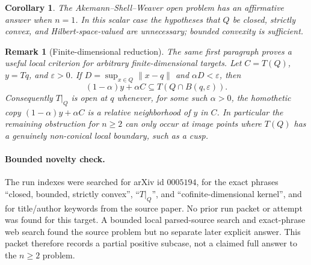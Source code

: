 \documentclass[11pt]{article}
\newtheorem{corollary}{Corollary}
\newtheorem{remark}{Remark}
\begin{document}
\begin{corollary}
The Akemann--Shell--Weaver open problem has an affirmative answer when
\(n=1\).  In this scalar case the hypotheses that \(Q\) be closed, strictly
convex, and Hilbert-space-valued are unnecessary; bounded convexity is
sufficient.
\end{corollary}

\begin{remark}[Finite-dimensional reduction]
The same first paragraph proves a useful local criterion for arbitrary
finite-dimensional targets.  Let \(C=T(Q)\), \(y=Tq\), and
\(\varepsilon>0\).  If \(D=\sup_{x\in Q}\|x-q\|\) and
\(\alpha D<\varepsilon\), then
\[
        (1-\alpha)y+\alpha C\subseteq T(Q\cap B(q,\varepsilon)).
\]
Consequently \(T|_Q\) is open at \(q\) whenever, for some such
\(\alpha>0\), the homothetic copy \((1-\alpha)y+\alpha C\) is a relative
neighborhood of \(y\) in \(C\).  In particular the remaining obstruction for
\(n\ge2\) can only occur at image points where \(T(Q)\) has a genuinely
non-conical local boundary, such as a cusp.
\end{remark}

\paragraph{Bounded novelty check.}
The run indexes were searched for arXiv id \(0005194\), for the exact
phrases ``closed, bounded, strictly convex'', ``\(T|_Q\)'', and
``cofinite-dimensional kernel'', and for title/author keywords from the
source paper.  No prior run packet or attempt was found for this target.
A bounded local parsed-source search and exact-phrase web search found the
source problem but no separate later explicit answer.  This packet therefore
records a partial positive subcase, not a claimed full answer to the
\(n\ge2\) problem.
\end{document}
